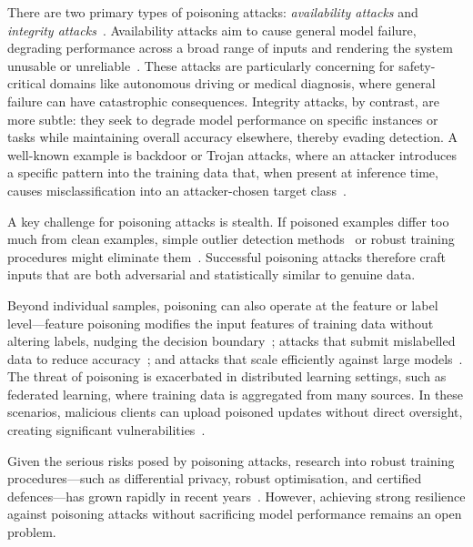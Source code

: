 There are two primary types of poisoning attacks: \textit{availability attacks} and \textit{integrity attacks}~\cite{jiang2019flexible}.
Availability attacks aim to cause general model failure, degrading performance across a broad range of inputs and rendering the system unusable or unreliable~\cite{jiang2019flexible}. 
These attacks are particularly concerning for safety-critical domains like autonomous driving or medical diagnosis, where general failure can have catastrophic consequences.
Integrity attacks, by contrast, are more subtle: they seek to degrade model performance on specific instances or tasks while maintaining overall accuracy elsewhere, thereby evading detection. 
A well-known example is backdoor or Trojan attacks, where an attacker introduces a specific pattern into the training data that, when present at inference time, causes misclassification into an attacker-chosen target class~\cite{saha2020hidden,turner2018clean,shokri2020bypassing,rawat2022devil,souri2022sleeper,chen2018detecting}.

A key challenge for poisoning attacks is stealth. 
If poisoned examples differ too much from clean examples, simple outlier detection methods~\cite{paudice2018detection} or robust training procedures might eliminate them~\cite{cintas_detecting_2020}. 
Successful poisoning attacks therefore craft inputs that are both adversarial and statistically similar to genuine data.

Beyond individual samples, poisoning can also operate at the feature or label level---feature poisoning modifies the input features of training data without altering labels, nudging the decision boundary~\cite{yerlikaya2022data}; attacks that submit mislabelled data to reduce accuracy~\cite{jha2023label}; and attacks that scale efficiently against large models~\cite{geiping2020witches}.
The threat of poisoning is exacerbated in distributed learning settings, such as federated learning, where training data is aggregated from many sources. 
In these scenarios, malicious clients can upload poisoned updates without direct oversight, creating significant vulnerabilities~\cite{bagdasaryan2020backdoor}.

Given the serious risks posed by poisoning attacks, research into robust training procedures—such as differential privacy, robust optimisation, and certified defences—has grown rapidly in recent years~\cite{steinhardt2017certified,wang2022threats}. 
However, achieving strong resilience against poisoning attacks without sacrificing model performance remains an open problem.




